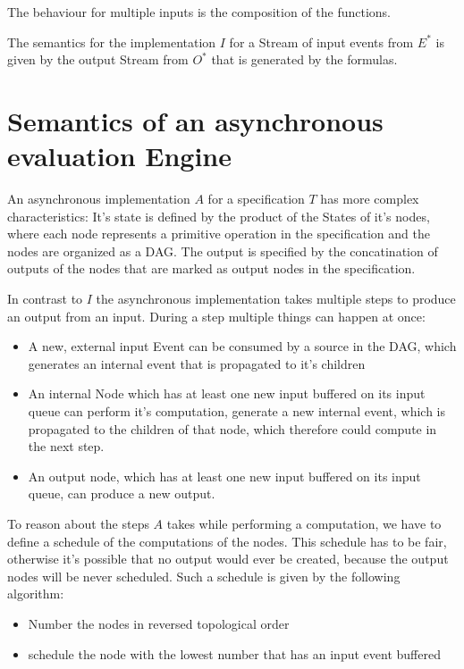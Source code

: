 The behaviour for multiple inputs is the composition of the functions.

The semantics for the implementation \(I\) for a Stream of input events from \(E^*\) is given by the output Stream
from \(O^*\) that is generated by the formulas.

\section{Semantics of an asynchronous evaluation Engine}
\label{sec:system:semantics_async}

An asynchronous implementation \(A\) for a specification \(T\) has more complex characteristics:
It's state is defined by the product of the States of it's nodes, where each node represents a primitive operation in
the specification and the nodes are organized as a DAG.%
The output is specified by the concatination of outputs of the nodes that are marked as output nodes in the specification.

In contrast to \(I\) the asynchronous implementation takes multiple steps to produce an output from an input.
During a step multiple things can happen at once:
\begin{itemize}
    \item A new, external input Event can be consumed by a source in the DAG, which generates an internal event that is propagated to it's children
    \item An internal Node which has at least one new input buffered on its input queue can perform
        it's computation, generate a new internal event, which is propagated to the children of that node, which therefore could compute in the next step.
    \item An output node, which has at least one new input buffered on its input queue, can produce a new output.
\end{itemize}

To reason about the steps $A$ takes while performing a computation, we have to define a schedule of the computations of the nodes.
This schedule has to be fair, otherwise it's possible that no output would ever be created, because the output nodes will be never scheduled.
Such a schedule is given by the following algorithm:

\begin{itemize}
    \item Number the nodes in reversed topological order
    \item schedule the node with the lowest number that has an input event buffered
\end{itemize}

